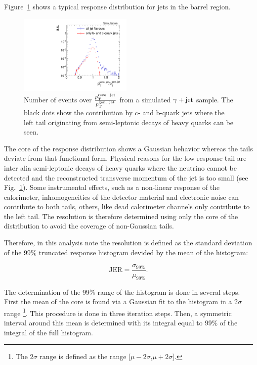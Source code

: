 \mbox{Figure \ref{fig:TypicalResponse}} shows a typical response distribution for jets in the barrel region. 
\begin{figure}[t]
  \centering
      \includegraphics[width=0.49\textwidth]{figures/resolution/generalApproach/intrinsicExampleContributionofBCQuarks.pdf}
  \caption{Number of events over $\frac{p_{\text{T}}^{\text{reco. jet}}}{p_{\text{T}}^{\text{gen. jet}}}$ from a simulated $\gamma + \text{jet}$ sample. 
           The black dots show the contribution by c- and b-quark jets where the left tail originating from semi-leptonic decays of heavy quarks can be seen.}  
  \label{fig:TypicalResponse}
\end{figure}
The core of the response distribution shows a Gaussian behavior whereas the tails deviate from that functional form.
Physical reasons for the low response tail are inter alia semi-leptonic decays of heavy quarks where the neutrino cannot be detected and the reconstructed transverse momentum of the jet is too small (see \mbox{Fig. \ref{fig:TypicalResponse}}). 
Some instrumental effects, such as a non-linear response of the calorimeter, inhomogeneities of the detector material and electronic noise can contribute to both tails, 
others, like dead calorimeter channels only contribute to the left tail. 
The resolution is therefore determined using only the core of the distribution to avoid the coverage of non-Gaussian tails.

Therefore, in this analysis note the resolution is defined as the standard deviation of the 99\% truncated response histogram devided by the mean of the histogram:

\begin{equation}\label{eq:resolutionFormula}
\text{JER} = \frac{\sigma_{99\%}}{\mu_{99\%}}.
\end{equation}

The determination of the 99\% range of the histogram is done in several steps. 
First the mean of the core is found via a Gaussian fit to the histogram in a 2$\sigma$ range \footnote{The 2$\sigma$ range is defined as the range [$\mu - 2\sigma$,$\mu + 2\sigma$].}. 
This procedure is done in three iteration steps.
Then, a symmetric interval around this mean is determined with its integral equal to 99\% of the integral of the full histogram. 

